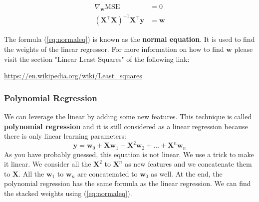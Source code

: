 \documentclass[12pt]{report}
\begin{document}
                \begin{align}
                \nabla_{\boldsymbol{w}}\text{MSE} &= 0 \\
                (\boldsymbol{X}^\top \boldsymbol{X})^{-1}\boldsymbol{X}^\top \boldsymbol{y} &= \boldsymbol{w} \label{eq:normaleq}
                \end{align}
                
                The formula (\ref{eq:normaleq}) is known as the \textbf{normal equation}. It is used to find the weights of the linear regressor.
                For more information on how to find $\boldsymbol{w}$ please visit the section "Linear Least Squares" of the following link:
                
                \url{https://en.wikipedia.org/wiki/Least_squares}
                
                \subsubsection{Polynomial Regression}
                    We can leverage the linear by adding some new features.
                    This technique is called \textbf{polynomial regression} and it is still considered as a linear regression because there is only linear learning parameters:
                    \begin{equation}
                        \boldsymbol{y} = \boldsymbol{w}_0 + \boldsymbol{X}\boldsymbol{w}_1 + \boldsymbol{X}^2\boldsymbol{w}_2 + \dots + \boldsymbol{X}^n\boldsymbol{w}_n
                    \end{equation}
                    As you have probably guessed, this equation is not linear. We use a trick to make it linear. We consider all the $\boldsymbol{X}^2$ to $\boldsymbol{X}^n$ as new features and we concatenate them to $\boldsymbol{X}$.
                    All the $\boldsymbol{w}_1$ to $\boldsymbol{w}_n$ are concatenated to $\boldsymbol{w}_0$ as well.
                    At the end, the polynomial regression has the same formula as the linear regression. We can find the stacked weights using (\ref{eq:normaleq}).
                    
\end{document}
